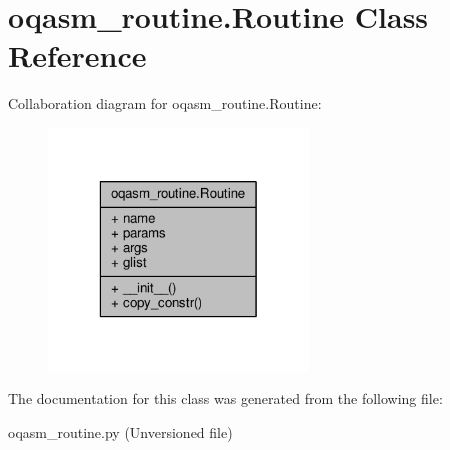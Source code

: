 \hypertarget{classoqasm__routine_1_1Routine}{\section{oqasm\-\_\-routine.\-Routine Class Reference}
\label{classoqasm__routine_1_1Routine}
}


Collaboration diagram for oqasm\-\_\-routine.\-Routine\-:
\nopagebreak
\begin{figure}[H]
\begin{center}
\leavevmode
\includegraphics[width=196pt]{d6/dba/classoqasm__routine_1_1Routine__coll__graph}
\end{center}
\end{figure}


The documentation for this class was generated from the following file\-:\begin{DoxyCompactItemize}
\item 
oqasm\-\_\-routine.\-py (\-Unversioned file)\end{DoxyCompactItemize}
